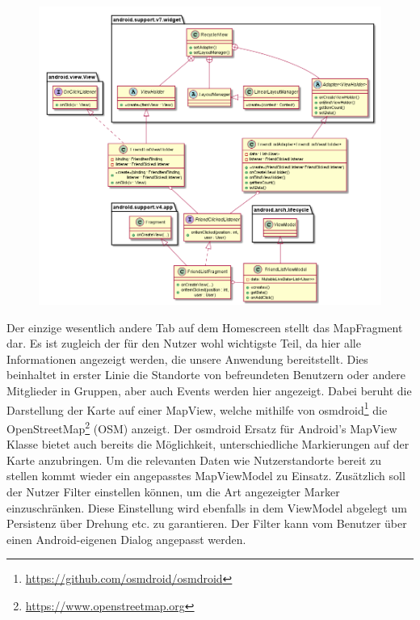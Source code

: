 \documentclass[parskip=full,11pt]{scrartcl}
\begin{document}
\begin{figure}
    \centering
    \includegraphics[width = \columnwidth]{lists.png}
	\label{fig:lists}
\end{figure}

\pagebreak
Der einzige wesentlich andere Tab auf dem Homescreen stellt das MapFragment dar.
Es ist zugleich der für den Nutzer wohl wichtigste Teil, da hier alle
Informationen angezeigt werden, die unsere Anwendung bereitstellt. Dies
beinhaltet in erster Linie die Standorte von befreundeten Benutzern oder andere
Mitglieder in Gruppen, aber auch Events werden hier angezeigt. Dabei beruht die
Darstellung der Karte auf einer MapView, welche mithilfe von
osmdroid\footnote{\url{https://github.com/osmdroid/osmdroid}} die
OpenStreetMap\footnote{\url{https://www.openstreetmap.org}} (OSM) anzeigt.
Der osmdroid Ersatz für Android's MapView Klasse bietet auch bereits die
Möglichkeit, unterschiedliche Markierungen auf der Karte anzubringen. Um die
relevanten Daten wie Nutzerstandorte bereit zu stellen kommt wieder ein angepasstes
MapViewModel zu Einsatz. Zusätzlich soll der Nutzer Filter einstellen können,
um die Art angezeigter Marker einzuschränken. Diese Einstellung wird ebenfalls
in dem ViewModel abgelegt um Persistenz über Drehung etc. zu garantieren. Der
Filter kann vom Benutzer über einen Android-eigenen Dialog angepasst werden.
\end{document}

